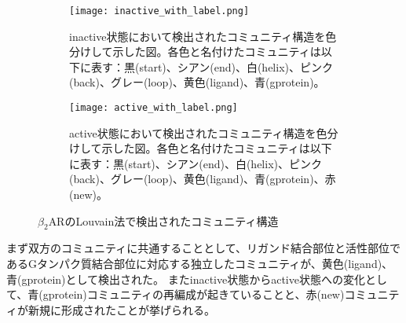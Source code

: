\begin{figure}[htbp]
    \centering
    \begin{subfigure}{0.80\textwidth} %
      \centering
      \texttt{[image: inactive\_with\_label.png]}
      \caption{inactive状態において検出されたコミュニティ構造を色分けして示した図。各色と名付けたコミュニティは以下に表す：黒(start)、シアン(end)、白(helix)、ピンク(back)、グレー(loop)、黄色(ligand)、青(gprotein)。}
      \label{fig:inactive_community}
    \end{subfigure}
    \hspace{0.02\textwidth} %
    \begin{subfigure}{0.80\textwidth}
      \centering
      \texttt{[image: active\_with\_label.png]}
      \caption{active状態において検出されたコミュニティ構造を色分けして示した図。各色と名付けたコミュニティは以下に表す：黒(start)、シアン(end)、白(helix)、ピンク(back)、グレー(loop)、黄色(ligand)、青(gprotein)、赤(new)。}
      \label{fig:active_community}
    \end{subfigure}
    \caption{$\beta_2$ARのLouvain法で検出されたコミュニティ構造}
    \label{fig:community-all}
  \end{figure}

\newpage

まず双方のコミュニティに共通することとして、リガンド結合部位と活性部位であるGタンパク質結合部位に対応する独立したコミュニティが、黄色(ligand)、青(gprotein)として検出された。
またinactive状態からactive状態への変化として、青(gprotein)コミュニティの再編成が起きていることと、赤(new)コミュニティが新規に形成されたことが挙げられる。

\begin{table}[!ht]
  \centering
  \caption{活性化に伴うコミュニティの再編成と、コミュニティを構成している残基群の比較}
  \label{tab:community_change}
\end{table}

